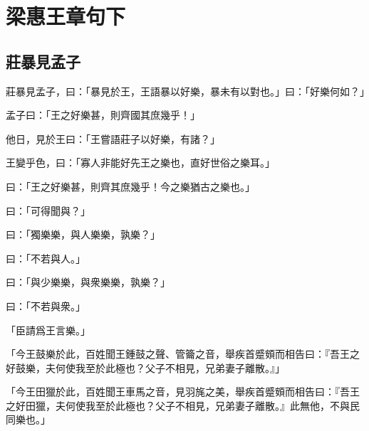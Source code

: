 \chapter{梁惠王章句下}
\kaishi*


\section{莊暴見孟子}

莊暴見孟子，曰：「暴見於王，王語暴以好樂，暴未有以對也。」曰：「好樂何如？」

孟子曰：「王之好樂甚，則齊國其庶幾乎！」

他日，見於王曰：「王嘗語莊子以好樂，有諸？」

王變乎色，曰：「寡人非能好先王之樂也，直好世俗之樂耳。」

曰：「王之好樂甚，則齊其庶幾乎！今之樂猶古之樂也。」

曰：「可得聞與？」

曰：「獨樂樂，與人樂樂，孰樂？」

曰：「不若與人。」

曰：「與少樂樂，與衆樂樂，孰樂？」

曰：「不若與衆。」

「臣請爲王言樂。」

「今王鼓樂於此，百姓聞王鍾鼓之聲、管籥之音，舉疾首蹙頞而相告曰：『吾王之好鼓樂，夫何使我至於此極也？父子不相見，兄弟妻子離散。』」

「今王田獵於此，百姓聞王車馬之音，見羽旄之美，舉疾首蹙頞而相告曰：『吾王之好田獵，夫何使我至於此極也？父子不相見，兄弟妻子離散。』此無他，不與民同樂也。」

